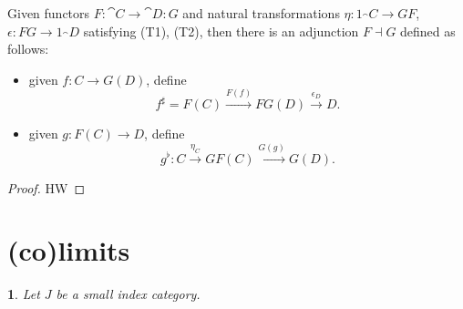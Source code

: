 \documentclass[12pt]{article}
\newtheorem{para}[theorem]{}
\begin{document}
\begin{theorem}
	Given functors $F:\cat{C}\to \cat{D}: G$ and natural transformations $\eta:1_\cat{C}\to GF$, $\epsilon:FG\to 1_\cat{D}$ satisfying (T1), (T2), then there is an adjunction $F\dashv G$ defined as follows:
	\begin{itemize}
		\item given $f:C\to G(D)$, define 
			\begin{equation*}
				f^\sharp = F(C) \overset{F(f)}{\to} FG(D) \overset{\epsilon_D}{\to} D.
			\end{equation*}

		\item given $g:F(C)\to D$, define 
			\begin{equation*}
				g^\flat: C \overset{\eta_C}{\to} GF(C) \overset{G(g)}{\to} G(D).
			\end{equation*}
	\end{itemize}
\end{theorem}
\begin{proof}
	HW
\end{proof}



\section{(co)limits} %

\begin{para}
	Let $J$ be a small index category.
\end{para}
\end{document}
